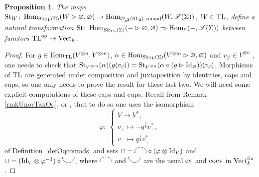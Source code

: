 \documentclass[pdftex]{sigma}%
\numberwithin{equation}{section}
\newtheorem{Proposition}[Theorem]{Proposition}
 { \theoremstyle{definition}
\newtheorem{Definition}[Theorem]{Definition}
\newtheorem{Note}[Theorem]{Note}
\newtheorem{Example}[Theorem]{Example}
\newtheorem{Remark}[Theorem]{Remark} }
\newcommand{\lcap}{\tikz[scale = 0.3] \draw[<-] (0,0) arc(180:0:1);}
\newcommand{\lcup}{\tikz[scale = 0.3] \draw[<-] (0,0) arc(-180:0:1);}
\newcommand{\St}{\operatorname{St}}
\newcommand{\Hom}{\operatorname{Hom}}
\newcommand{\Oq}{\mathcal{O}_{q^2}({\rm SL}_2)}
\begin{document}
\begin{Proposition}\label{propStNat}
The maps $\St_W \colon \Hom_{{\rm Sk}_{{\rm TL}}(\Sigma)}(W\rhd \varnothing,\varnothing) \to \Hom_{\Oq\text{-}{\rm comod}}(W, \mathscr{S}(\Sigma))$, $W \in {\rm TL}$, define a natural transformation $\St\colon \Hom_{{\rm Sk}_{{\rm TL}}(\Sigma)}(-\rhd \varnothing,\varnothing) \Rightarrow \Hom_{\mathcal{E}}(-, \mathscr{S}(\Sigma))$ between functors ${\rm TL}^{\rm op}\to {\rm Vect}_k$.
\end{Proposition}
\begin{proof}
For $g \in \Hom_{{\rm TL}}(V^{\otimes n},V^{\otimes m})$, $\alpha \in \Hom_{{\rm Sk}_{{\rm TL}}(\Sigma)}(V^{\otimes m}\rhd \varnothing,\varnothing)$ and $v_{\vec{\varepsilon}} \in V^{\otimes n}$
, one needs to check that $\St_{V^{\otimes m}}(\alpha)(g(v_{\vec{\varepsilon}})) = \St_{V^{\otimes n}}(\alpha \circ (g\rhd {\rm Id}_\varnothing))(v_{\vec{\varepsilon}})$. Morphisms of ${\rm TL}$ are generated under composition and juxtaposition by identities, caps and cups, so one only needs to prove the result for these last two.
We will need some explicit computations of these caps and cups. Recall from Remark \ref{rmkUnorTanOq}, or \cite[Theorem~4.2]{Tingley}, that to do so one uses the isomorphism
\[
\varphi \colon\ \begin{cases}
V \to V^*,
\\
v_+ \mapsto -q^{\frac{5}{2}} v_-^*,
\\ v_- \mapsto q^{\frac{1}{2}}v_+^*\end{cases}
\]
 of Definition~\ref{defOqcomods} and sets $\cap = \lcap \circ (\varphi \otimes {\rm Id}_V)$ and $\cup = ({\rm Id}_V \otimes \varphi^{-1})\circ \lcup$, where $\lcap$ and $\lcup$ are the usual ${\rm ev}$ and ${\rm coev}$ in ${\rm Vect}_k^{\rm fin}$.


\end{proof}
\end{document}
